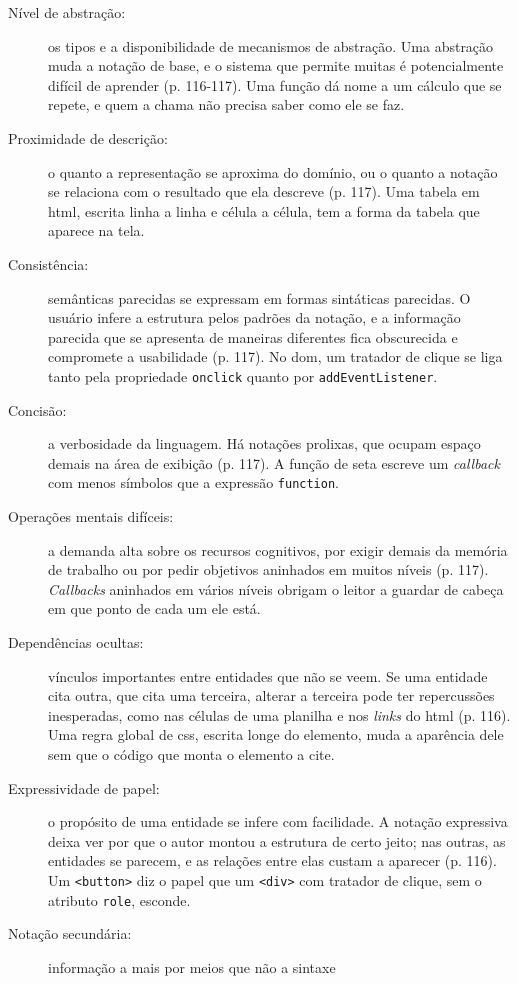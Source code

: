 \begin{description}
\item[{Nível de abstração:}] os tipos e a disponibilidade de mecanismos de
abstração. Uma abstração muda a notação de base, e o sistema que
permite muitas é potencialmente difícil de aprender (p. 116-117).
Uma função dá nome a um cálculo que se repete, e quem a chama não
precisa saber como ele se faz.
\item[{Proximidade de descrição:}] o quanto a representação se aproxima do
domínio, ou o quanto a notação se relaciona com o resultado que ela
descreve (p. 117). Uma tabela em \gls{html}, escrita linha a linha
e célula a célula, tem a forma da tabela que aparece na tela.
\item[{Consistência:}] semânticas parecidas se expressam em formas
sintáticas parecidas. O usuário infere a estrutura pelos padrões da
notação, e a informação parecida que se apresenta de maneiras
diferentes fica obscurecida e compromete a usabilidade (p. 117). No \gls{dom}, um tratador de
clique se liga tanto pela propriedade \texttt{onclick} quanto por
\texttt{addEventListener}.
\item[{Concisão:}] a verbosidade da linguagem. Há notações prolixas, que
ocupam espaço demais na área de exibição (p. 117). A função de seta
escreve um \emph{callback} com menos símbolos que a expressão \texttt{function}.
\item[{Operações mentais difíceis:}] a demanda alta sobre os recursos
cognitivos, por exigir demais da memória de trabalho ou por pedir
objetivos aninhados em muitos níveis (p. 117). \emph{Callbacks} aninhados
em vários níveis obrigam o leitor a guardar de cabeça em que ponto de
cada um ele está.
\item[{Dependências ocultas:}] vínculos importantes entre entidades que não
se veem. Se uma entidade cita outra, que cita uma terceira, alterar a
terceira pode ter repercussões inesperadas, como nas células de uma
planilha e nos \emph{links} do \gls{html} (p. 116). Uma regra global de
\gls{css}, escrita longe do elemento, muda a aparência dele sem que
o código que monta o elemento a cite.
\item[{Expressividade de papel:}] o propósito de uma entidade se infere com
facilidade. A notação expressiva deixa ver por que o autor montou a
estrutura de certo jeito; nas outras, as entidades se parecem, e as
relações entre elas custam a aparecer (p. 116). Um \texttt{<button>} diz o
papel que um \texttt{<div>} com tratador de clique, sem o atributo \texttt{role},
esconde.
\item[{Notação secundária:}] informação a mais por meios que não a sintaxe

\end{description}
